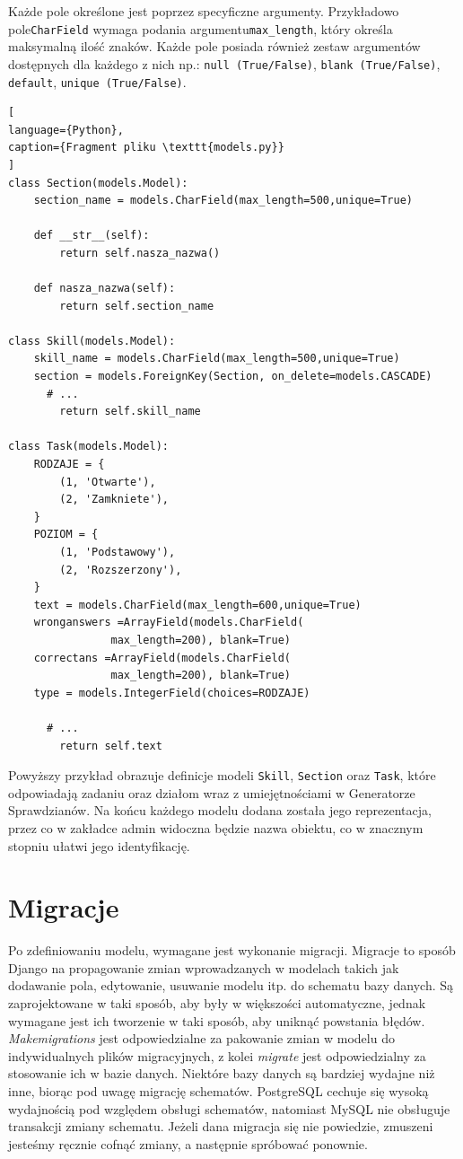 \documentclass[oneside,polski,logo,indent]{amuthesis}
\begin{document}
\begin{enumerate}
\begin{enumerate}
Każde pole określone jest poprzez specyficzne argumenty. Przykładowo pole\texttt{CharField} wymaga podania argumentu\texttt{max\_length}, który określa maksymalną ilość znaków. Każde pole posiada również zestaw argumentów dostępnych dla każdego z nich np.: \texttt{null (True/False)}, \texttt{blank (True/False)}, \texttt{default}, \texttt{unique (True/False)}.

\begin{lstlisting}[
language={Python},
caption={Fragment pliku \texttt{models.py}}
]
class Section(models.Model):
    section_name = models.CharField(max_length=500,unique=True)

    def __str__(self):
        return self.nasza_nazwa()

    def nasza_nazwa(self):
        return self.section_name

class Skill(models.Model):
    skill_name = models.CharField(max_length=500,unique=True)
    section = models.ForeignKey(Section, on_delete=models.CASCADE)
	  # ...
        return self.skill_name

class Task(models.Model):
    RODZAJE = {
        (1, 'Otwarte'),
        (2, 'Zamkniete'),
    }
    POZIOM = {
        (1, 'Podstawowy'),
        (2, 'Rozszerzony'),
    }
    text = models.CharField(max_length=600,unique=True)
    wronganswers =ArrayField(models.CharField(
				max_length=200), blank=True)
    correctans =ArrayField(models.CharField(
				max_length=200), blank=True)
    type = models.IntegerField(choices=RODZAJE)

	  # ...
        return self.text
\end{lstlisting}

Powyższy przykład obrazuje definicje modeli \texttt{Skill}, \texttt{Section} oraz \texttt{Task}, które odpowiadają zadaniu oraz działom wraz z umiejętnościami w Generatorze Sprawdzianów. Na końcu każdego modelu dodana została jego reprezentacja, przez co w zakładce admin widoczna będzie nazwa obiektu, co w znacznym stopniu ułatwi jego identyfikację.  
\section{Migracje}
Po zdefiniowaniu modelu, wymagane jest wykonanie migracji. Migracje to sposób Django na propagowanie zmian wprowadzanych w modelach takich jak dodawanie pola, edytowanie, usuwanie modelu itp. do schematu bazy danych. Są zaprojektowane w taki sposób, aby były w większości automatyczne, jednak wymagane jest ich tworzenie w taki sposób, aby uniknąć powstania błędów. \emph{Makemigrations} jest odpowiedzialne za pakowanie zmian w modelu do indywidualnych plików migracyjnych, z kolei \emph{migrate} jest odpowiedzialny za stosowanie ich w bazie danych.
Niektóre bazy danych są bardziej wydajne niż inne, biorąc pod uwagę migrację schematów. PostgreSQL cechuje się wysoką wydajnością pod względem obsługi schematów, natomiast MySQL nie obsługuje transakcji zmiany schematu. Jeżeli dana migracja się nie powiedzie, zmuszeni jesteśmy ręcznie cofnąć zmiany, a następnie spróbować ponownie. 


\end{enumerate}
\end{enumerate}
\end{document}
